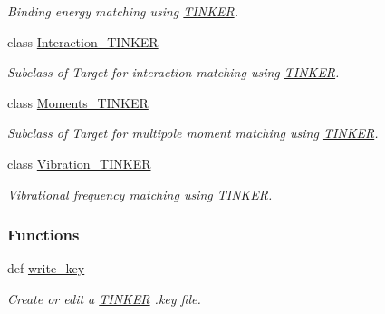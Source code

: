 \begin{DoxyCompactItemize}
\begin{DoxyCompactList}\small\item\em Binding energy matching using \hyperlink{classforcebalance_1_1tinkerio_1_1TINKER}{T\-I\-N\-K\-E\-R}. \end{DoxyCompactList}\item 
class \hyperlink{classforcebalance_1_1tinkerio_1_1Interaction__TINKER}{Interaction\-\_\-\-T\-I\-N\-K\-E\-R}
\begin{DoxyCompactList}\small\item\em Subclass of Target for interaction matching using \hyperlink{classforcebalance_1_1tinkerio_1_1TINKER}{T\-I\-N\-K\-E\-R}. \end{DoxyCompactList}\item 
class \hyperlink{classforcebalance_1_1tinkerio_1_1Moments__TINKER}{Moments\-\_\-\-T\-I\-N\-K\-E\-R}
\begin{DoxyCompactList}\small\item\em Subclass of Target for multipole moment matching using \hyperlink{classforcebalance_1_1tinkerio_1_1TINKER}{T\-I\-N\-K\-E\-R}. \end{DoxyCompactList}\item 
class \hyperlink{classforcebalance_1_1tinkerio_1_1Vibration__TINKER}{Vibration\-\_\-\-T\-I\-N\-K\-E\-R}
\begin{DoxyCompactList}\small\item\em Vibrational frequency matching using \hyperlink{classforcebalance_1_1tinkerio_1_1TINKER}{T\-I\-N\-K\-E\-R}. \end{DoxyCompactList}\end{DoxyCompactItemize}
\subsubsection*{Functions}
\begin{DoxyCompactItemize}
\item 
def \hyperlink{namespaceforcebalance_1_1tinkerio_a6ec08d741fc7ca3bb7a28013b528317c}{write\-\_\-key}
\begin{DoxyCompactList}\small\item\em Create or edit a \hyperlink{classforcebalance_1_1tinkerio_1_1TINKER}{T\-I\-N\-K\-E\-R} .key file. \end{DoxyCompactList}\end{DoxyCompactItemize}
